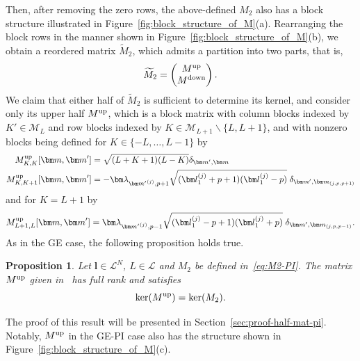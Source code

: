 \documentclass{article}
\newcommand{\blamb}[2]{\bm\lambda^{#1}_{#2}}
\newtheorem{proposition}[theorem]{Proposition}
\numberwithin{equation}{section}
\def\bl{{\bm l}}
\def\bbm{{\bm m}}
\def\calM{\mathcal{M}}
\def\calL{\mathcal{L}}
\def\MlL{{M}}
\def\Mup{{\MlL}^{\textup{up}}}
\def\Mlow{{\MlL}^{\textup{down}}}
\begin{document}
Then, after removing the zero rows, the above-defined $\MlL_2$ also has a block structure illustrated in Figure~\ref{fig:block_structure_of_M}(a).
Rearranging the block rows in the manner shown in Figure~\ref{fig:block_structure_of_M}(b), we obtain a reordered matrix $\widetilde{\MlL}_2$, which admits a partition into two parts, that is, 
\[
    \widetilde{\MlL}_2 = \begin{pmatrix}
         \Mup \\
         \Mlow \\
     \end{pmatrix}.
\]
We claim that either half of $\widetilde{\MlL}_2$ is sufficient to determine its kernel, and consider only its upper half $\Mup$, which is a block matrix with column blocks indexed by $K'\in\calM_L$ and row blocks indexed by $K\in\calM_{L+1} \backslash \{ L, L+1\}$, and with nonzero blocks being defined 
for $K\in \{-L, \ldots, L-1\}$ by
\begin{align}
    \Mup_{K,K}[\bbm,\bbm'] &= \sqrt{(L+K+1)(L-K)}\delta_{\bbm',\bbm} \label{eq:MKK-PI}\\
    \Mup_{K,K+1}[\bbm,\bbm'] &= 
    -\blamb{}{{\bbm'}^{(j)},p+1}\sqrt{(\bl^{(j)}_1+p+1)(\bl^{(j)}_1-p)}\;\delta_{\bbm',\bbm_{(j,p,p+1)}}
\end{align}
and for $K = L+1$ by
\begin{equation}\label{eq:MLpL-PI}
    \Mup_{L+1,L}[\bbm,\bbm'] = 
    \blamb{}{{\bbm'}^{(j)},p-1}\sqrt{(\bl^{(j)}_1-p+1)(\bl^{(j)}_1+p)}
    \;\delta_{\bbm' ,\bbm_{(j,p,p-1)}}.
\end{equation}
As in the GE case, the following proposition holds true.
\begin{proposition}\label{prop:ker-M2-GEPI}
Let $\bl\in\calL^N$, $L \in \calL$ and $\MlL_2$ be defined in~\eqref{eq:M2-PI}. 
The matrix $\Mup$ given in~ has full rank and satisfies
\[
    \ker(\Mup) = \ker(\MlL_2).
\]
\end{proposition}
The proof of this result will be presented in Section~\ref{sec:proof-half-mat-pi}. Notably, $\Mup$ in the GE-PI case also has the structure shown in Figure~\ref{fig:block_structure_of_M}(c). 
\end{document}
